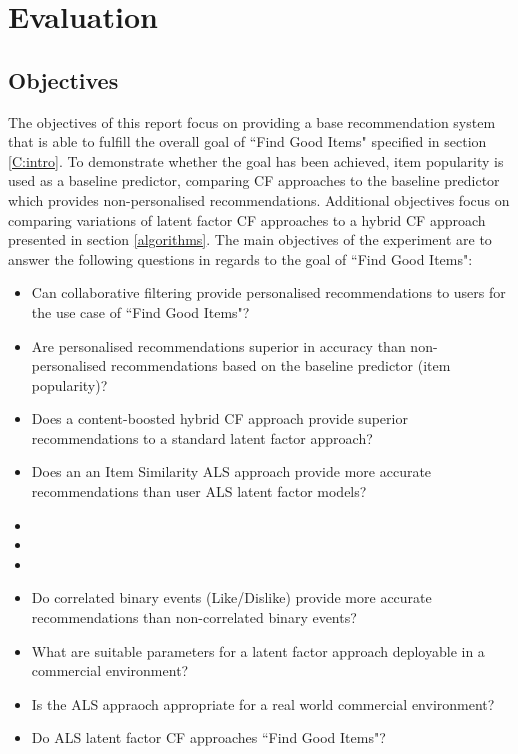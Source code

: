 \chapter{Evaluation}\label{C:evaluation}

\section{Objectives}

The objectives of this report focus on providing a base recommendation system that is able to fulfill the overall goal of ``Find Good Items" specified in section \ref{C:intro}. To demonstrate whether the goal has been achieved, item popularity is used as a baseline predictor, comparing CF approaches to the baseline predictor which provides non-personalised recommendations. Additional objectives focus on comparing variations of latent factor CF approaches to a hybrid CF approach presented in section \ref{algorithms}. The main objectives of the experiment are to answer the following questions in regards to the goal of ``Find Good Items":

\begin{itemize}
     \item{Can collaborative filtering provide personalised recommendations to users for the use case of ``Find Good Items"?}
     \item{Are personalised recommendations superior in accuracy than non-personalised recommendations based on the baseline predictor (item popularity)?}
     \item{Does a content-boosted hybrid CF approach provide superior recommendations to a standard latent factor approach?}
     \item{Does an an Item Similarity ALS approach provide more accurate recommendations than user ALS latent factor models?}
     \item{}
     \item{}
     \item{}
     \item{Do correlated binary events (Like/Dislike) provide more accurate recommendations than non-correlated binary events?}
     \item{What are suitable parameters for a latent factor approach deployable in a commercial environment?}
     \item{Is the ALS appraoch appropriate for a real world commercial environment?}
     \item{Do ALS latent factor CF approaches ``Find Good Items"?}
\end{itemize}

